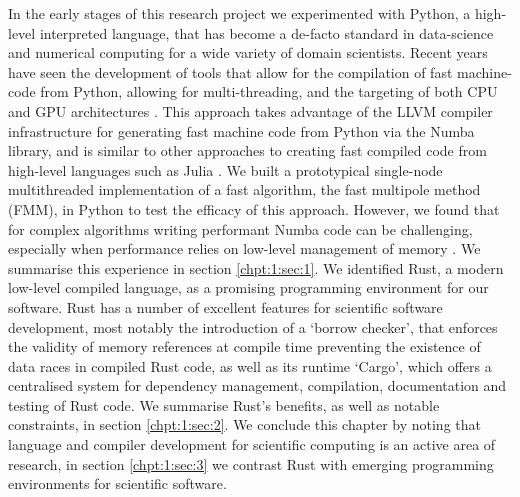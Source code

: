 In the early stages of this research project we experimented with Python, a high-level interpreted language, that has become a de-facto standard in data-science and numerical computing for a wide variety of domain scientists. Recent years have seen the development of tools that allow for the compilation of fast machine-code from Python, allowing for multi-threading, and the targeting of both CPU and GPU architectures \cite{lam2015numba}. This approach takes advantage of the LLVM compiler infrastructure for generating fast machine code from Python via the Numba library, and is similar to other approaches to creating fast compiled code from high-level languages such as Julia \cite{bezanson2017julia}. We built a prototypical single-node multithreaded implementation of a fast algorithm, the fast multipole method (FMM), in Python to test the efficacy of this approach. However, we found that for complex algorithms writing performant Numba code can be challenging, especially when performance relies on low-level management of memory \cite{kailasa2022pyexafmm}. We summarise this experience in section \ref{chpt:1:sec:1}. We identified Rust, a modern low-level compiled language, as a promising programming environment for our software. Rust has a number of excellent features for scientific software development, most notably the introduction of a `borrow checker', that enforces the validity of memory references at compile time preventing the existence of data races in compiled Rust code, as well as its runtime `Cargo', which offers a centralised system for dependency management, compilation, documentation and testing of Rust code. We summarise Rust's benefits, as well as notable constraints, in section \ref{chpt:1:sec:2}. We conclude this chapter by noting that language and compiler development for scientific computing is an active area of research, in section \ref{chpt:1:sec:3} we contrast Rust with emerging programming environments for scientific software.